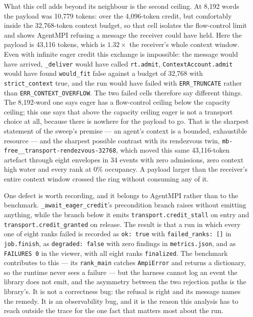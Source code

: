 \documentclass[11pt]{article}
\begin{document}
What this cell adds beyond its neighbour is the second ceiling. At 8{,}192 words the
payload was 10{,}779 tokens: over the 4{,}096-token credit, but comfortably inside the
32{,}768-token context budget, so that cell isolates the flow-control limit and shows
AgentMPI refusing a message the receiver could have held. Here the payload is 43{,}116
tokens, which is $1.32\times$ the receiver's whole context window. Even with infinite
eager credit this exchange is impossible: the message would have arrived,
\texttt{\_deliver} would have called \texttt{rt.admit}, \texttt{ContextAccount.admit}
would have found \texttt{would\_fit} false against a budget of 32{,}768 with
\texttt{strict\_context} true, and the run would have failed with
\texttt{ERR\_TRUNCATE} rather than \texttt{ERR\_CONTEXT\_OVERFLOW}. The two failed
cells therefore say different things. The 8{,}192-word one says eager has a
flow-control ceiling below the capacity ceiling; this one says that above the capacity
ceiling eager is not a transport choice at all, because there is nowhere for the
payload to go. That is the sharpest statement of the sweep's premise --- an agent's
context is a bounded, exhaustible resource --- and the sharpest possible contrast with
its rendezvous twin, \texttt{mb-free\_\_transport-rendezvous-32768}, which moved this
same 43{,}116-token artefact through eight envelopes in 34 events with zero
admissions, zero context high water and every rank at 0\% occupancy. A payload
larger than the receiver's entire context window crossed the ring without consuming
any of it.

One defect is worth recording, and it belongs to AgentMPI rather than to the
benchmark. \texttt{\_await\_eager\_credit}'s precondition branch raises without
emitting anything, while the branch below it emits
\texttt{transport.credit\_stall} on entry and \texttt{transport.credit\_granted} on
release. The result is that a run in which every one of eight ranks failed is
recorded as \texttt{ok: true} with \texttt{failed\_ranks: []} in
\texttt{job.finish}, as \texttt{degraded: false} with zero findings in
\texttt{metrics.json}, and as \texttt{FAILURES 0} in the viewer, with all eight ranks
\texttt{finalized}. The benchmark contributes to this --- its \texttt{rank\_main}
catches \texttt{AmpiError} and returns a dictionary, so the runtime never sees a
failure --- but the harness cannot log an event the library does not emit, and the
asymmetry between the two rejection paths is the library's. It is not a correctness
bug: the refusal is right and its message names the remedy. It is an observability
bug, and it is the reason this analysis has to reach outside the trace for the one
fact that matters most about the run.
\end{document}
